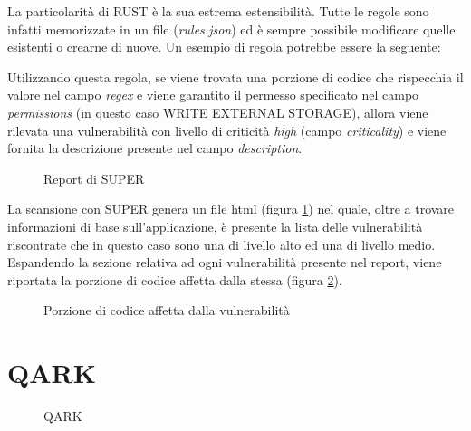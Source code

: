 La particolarità di RUST è la sua estrema estensibilità. Tutte le regole sono infatti memorizzate in un file (\emph{rules.json}) ed è sempre possibile modificare quelle esistenti o crearne di nuove. Un esempio di regola potrebbe essere la seguente:



Utilizzando questa regola, se viene trovata una porzione di codice che rispecchia il valore nel campo \emph{regex} e viene garantito il permesso specificato nel campo \emph{permissions} (in questo caso WRITE EXTERNAL STORAGE), allora viene rilevata una vulnerabilità con livello di criticità \emph{high} (campo \emph{criticality}) e viene fornita la descrizione presente nel campo \emph{description}.

\begin{figure}[h]
	\centering 
	\caption{Report di SUPER}
	\label{fig:superResults} 
\end{figure}

La scansione con SUPER genera un file html (figura \ref{fig:superResults}) nel quale, oltre a trovare informazioni di base sull'applicazione, è presente la lista delle vulnerabilità riscontrate che in questo caso sono una di livello alto ed una di livello medio. Espandendo la sezione relativa ad ogni vulnerabilità presente nel report, viene riportata la porzione di codice affetta dalla stessa (figura \ref{fig:superVuln}). 

\begin{figure}[h]
	\centering 
	\caption{Porzione di codice affetta dalla vulnerabilità}
	\label{fig:superVuln} 
\end{figure}


\section{QARK}
\begin{figure}[h]
	\centering 
	\caption{QARK}
	\label{fig:qark}
\end{figure}

